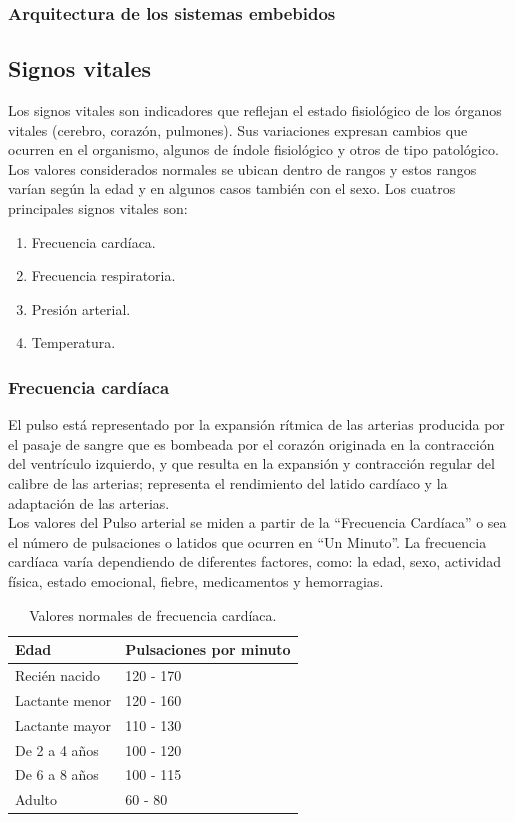 	\subsubsection{Arquitectura de los sistemas embebidos}
	\subsection{Signos vitales}
	Los signos vitales son indicadores que reflejan el estado fisiológico de los órganos vitales (cerebro, corazón, pulmones). Sus variaciones expresan cambios que ocurren en el organismo, algunos de índole fisiológico y otros de tipo patológico. Los valores considerados normales se ubican dentro de rangos y estos rangos varían según la edad y en algunos casos también con el sexo. Los cuatros principales signos vitales son: 
	\begin{enumerate}
		\item Frecuencia cardíaca.
		\item Frecuencia respiratoria.
		\item Presión arterial.
		\item Temperatura.
	\end{enumerate}

	\subsubsection{Frecuencia cardíaca}
	El pulso está representado por la expansión rítmica de las arterias producida por el pasaje de sangre que es bombeada por el corazón originada en la contracción del ventrículo izquierdo, y que resulta en la expansión y contracción regular del calibre de las arterias; representa el rendimiento del latido cardíaco y la adaptación de las arterias.\\
	
	Los valores del Pulso arterial se miden a partir de la “Frecuencia Cardíaca” o sea el número de pulsaciones o latidos que ocurren en “Un Minuto”. La frecuencia cardíaca varía dependiendo de diferentes factores, como: la edad, sexo, actividad física, estado emocional, fiebre, medicamentos y hemorragias.
	
	\begin{table}[htbp]
		\begin{center}
			\begin{tabular}{|l|l|}
				\hline
				\textbf{Edad} & \textbf{Pulsaciones por minuto} \\
				\hline \hline
				Recién nacido & 120 - 170  \\
				\hline
				Lactante menor & 120 - 160  \\
				\hline
				Lactante mayor & 110 - 130  \\
				\hline
				De 2 a 4 años & 100 - 120  \\
				\hline
				De 6 a 8 años & 100 - 115  \\
				\hline
				Adulto & 60 - 80  \\
				\hline
			\end{tabular}
			\caption{Valores normales de frecuencia cardíaca.}
		\end{center}
	\end{table}

